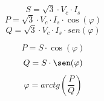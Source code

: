 \documentclass[../main]{subfiles}
\begin{document}
\begin{equation}
  S= \sqrt{3} \cdot  V_c  \cdot I_s
\end{equation}
\begin{equation}
  P= \sqrt{3} \cdot  V_c  \cdot I_s \cdot \cos(\varphi)
\end{equation}
\begin{equation}
  Q= \sqrt{3} \cdot  V_c  \cdot I_s \cdot sen(\varphi)
\end{equation}

\begin{equation}
  P= S \cdot \cos(\varphi)
\end{equation}
\begin{equation}
  Q= S \cdot \sen(\varphi)
\end{equation}
\begin{equation}
  \varphi=arctg({\frac{P}{Q}})
\end{equation}
\end{document}
